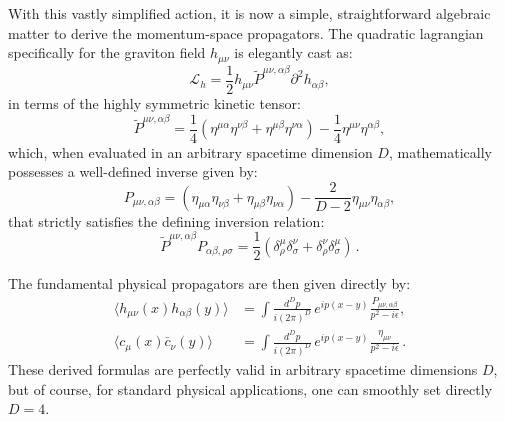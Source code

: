 With this vastly simplified action, it is now a simple, straightforward algebraic matter to derive the momentum-space propagators. The quadratic lagrangian specifically for the graviton field \(h_{\mu\nu}\) is elegantly cast as:
\begin{equation} \label{eq:lagrangian_quadratic_cast}
    \mathcal{L}_h = \frac{1}{2} h_{\mu\nu} \tilde{P}^{\mu\nu, \alpha\beta} \partial^2 h_{\alpha\beta},
\end{equation}
in terms of the highly symmetric kinetic tensor:
\begin{equation} \label{eq:kinetic_tensor}
    \tilde{P}^{\mu\nu, \alpha\beta} = \frac{1}{4} ( \eta^{\mu\alpha}\eta^{\nu\beta} + \eta^{\mu\beta}\eta^{\nu\alpha} ) - \frac{1}{4} \eta^{\mu\nu}\eta^{\alpha\beta},
\end{equation}
which, when evaluated in an arbitrary spacetime dimension \(D\), mathematically possesses a well-defined inverse given by:
\begin{equation} \label{eq:kinetic_inverse}
    P_{\mu\nu, \alpha\beta} = ( \eta_{\mu\alpha}\eta_{\nu\beta} + \eta_{\mu\beta}\eta_{\nu\alpha} ) - \frac{2}{D-2} \eta_{\mu\nu}\eta_{\alpha\beta},
\end{equation}
that strictly satisfies the defining inversion relation:
\begin{equation} \label{eq:inverse_identity}
    \tilde{P}^{\mu\nu, \alpha\beta} P_{\alpha\beta, \rho\sigma} = \frac{1}{2}( \delta^\mu_\rho \delta^\nu_\sigma + \delta^\nu_\rho \delta^\mu_\sigma ) \, .
\end{equation}

The fundamental physical propagators are then given directly by:
\begin{equation} \label{eq:propagators_gravity}
    \begin{aligned}
        \langle h_{\mu\nu}(x) h_{\alpha\beta}(y) \rangle & = \int \frac{d^D p}{i(2\pi)^D} \, e^{ip(x-y)} \frac{P_{\mu\nu, \alpha\beta}}{p^2 - i\epsilon}, \\
        \langle c_\mu(x) \bar{c}_\nu(y) \rangle          & = \int \frac{d^D p}{i(2\pi)^D} \, e^{ip(x-y)} \frac{\eta_{\mu\nu}}{p^2 - i\epsilon} \, .
    \end{aligned}
\end{equation}
These derived formulas are perfectly valid in arbitrary spacetime dimensions \(D\), but of course, for standard physical applications, one can smoothly set directly \(D = 4\).